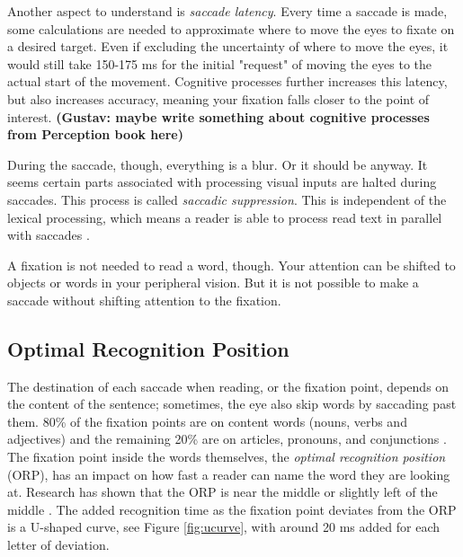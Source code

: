 Another aspect to understand is \textit{saccade latency}. Every time a saccade is made, some calculations are needed to approximate where to move the eyes to fixate on a desired target. Even if excluding the uncertainty of where to move the eyes, it would still take 150-175 ms for the initial "request" of moving the eyes to the actual start of the movement. Cognitive processes further increases this latency, but also increases accuracy, meaning your fixation falls closer to the point of interest.
\textbf{
(Gustav: maybe write something about cognitive processes from Perception book here)}

During the saccade, though, everything is a blur. Or it should be anyway. It seems certain parts associated with processing visual inputs are halted during saccades. This process is called \textit{saccadic suppression}. This is independent of the lexical processing, which means a reader is able to process read text in parallel with saccades \cite{KILDE MATHIAS}.

A fixation is not needed to read a word, though. Your attention can be shifted to objects or words in your peripheral vision. But it is not possible to make a saccade without shifting attention to the fixation.

\subsection{Optimal Recognition Position} \label{ORP}
The destination of each saccade when reading, or the fixation point, depends on the content of the sentence; sometimes, the eye also skip words by saccading past them. 80\% of the fixation points are on content words (nouns, verbs and adjectives) and the remaining 20\% are on articles, pronouns, and conjunctions \cite{eysenck_cognitive_2010}. The fixation point inside the words themselves, the \textit{optimal recognition position} (ORP), has an impact on how fast a reader can name the word they are looking at. Research has shown that the ORP is near the middle or slightly left of the middle \cite{oregan_optimal_1992, nazir_letter_1998, oregan_convenient_1984}. The added recognition time as the fixation point deviates from the ORP is a U-shaped curve, see Figure \ref{fig:ucurve}, with around 20 ms added for each letter of deviation.

